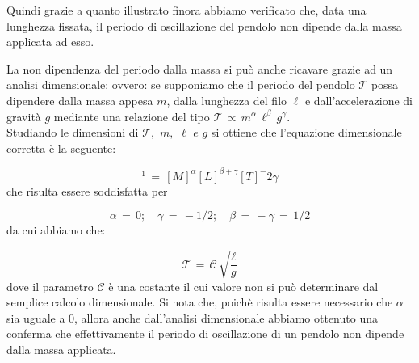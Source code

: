 Quindi grazie a quanto illustrato finora abbiamo verificato che, data una lunghezza fissata, il periodo di oscillazione del pendolo non dipende dalla massa applicata ad esso.

La non dipendenza del periodo dalla massa si può anche ricavare grazie ad un analisi dimensionale; ovvero: se supponiamo che il periodo del pendolo $\mathcal{T}$ possa dipendere dalla massa appesa $m$, dalla lunghezza del filo $\ell$ e dall'accelerazione di gravità $g$ mediante una relazione del tipo $\mathcal{T} \,\propto\, m^\alpha \, \ell^\beta \, g^\gamma$.\\
Studiando le dimensioni di $\mathcal{T}, \,\, m, \,\, \ell \,\,e\,\, g$ si ottiene che l'equazione dimensionale corretta è la seguente:

\begin{equation*}
	[T]^1 \,=\, [M]^\alpha[L]^{\beta+\gamma}[T]^-2\gamma 
\end{equation*}
%
che risulta essere soddisfatta per

\begin{equation*}
	\alpha \,=\, 0; \quad \gamma \,=\, -1/2; \quad \beta \,=\, -\gamma \,=\, 1/2 
\end{equation*}
%
da cui abbiamo che:

\begin{equation*}
	\mathcal{T} \,=\, \mathcal{C} \, \sqrt{\frac{\ell}{g}}
\end{equation*}
%
dove il parametro $\mathcal{C}$ è una costante il cui valore non si può determinare dal semplice calcolo dimensionale. Si nota che, poichè risulta essere necessario che $\alpha$ sia uguale a 0, allora anche dall'analisi dimensionale abbiamo ottenuto una conferma che effettivamente il periodo di oscillazione di un pendolo non dipende dalla massa applicata.
